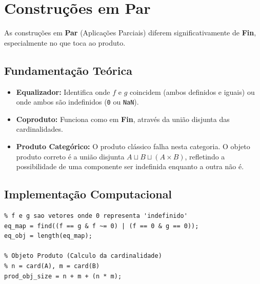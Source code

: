 \section{Construções em Par}

As construções em \textbf{Par} (Aplicações Parciais) diferem significativamente de \textbf{Fin}, especialmente no que toca ao produto.

\subsection{Fundamentação Teórica}
\begin{itemize}
    \item \textbf{Equalizador:} Identifica onde $f$ e $g$ coincidem (ambos definidos e iguais) ou onde ambos são indefinidos (\texttt{0} ou \texttt{NaN}).
    \item \textbf{Coproduto:} Funciona como em \textbf{Fin}, através da união disjunta das cardinalidades.
    \item \textbf{Produto Categórico:} O produto clássico falha nesta categoria. O objeto produto correto é a união disjunta $A \sqcup B \sqcup (A \times B)$, refletindo a possibilidade de uma componente ser indefinida enquanto a outra não é.
\end{itemize}

\subsection{Implementação Computacional}
\begin{lstlisting}[caption={Equalizador e Objeto Produto em Par}]
% Equalizador Parcial
% f e g sao vetores onde 0 representa 'indefinido'
eq_map = find((f == g & f ~= 0) | (f == 0 & g == 0));
eq_obj = length(eq_map);

% Objeto Produto (Calculo da cardinalidade)
% n = card(A), m = card(B)
prod_obj_size = n + m + (n * m);
\end{lstlisting}